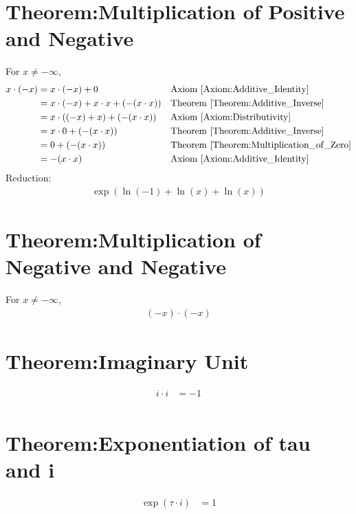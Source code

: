 \documentclass[12pt,a4paper]{report}
\begin{document}
\section{Theorem:Multiplication of Positive and Negative}
\label{Theorem:Multiplication_of_Positive_and_Negative}
For $x \neq -\infty$,
\begin{align*}
x \cdot (-x)
&= x \cdot (-x) + 0
&& \text{Axiom \ref{Axiom:Additive_Identity}} \\
&= x \cdot (-x) + x \cdot x + (- (x \cdot x))
&& \text{Theorem \ref{Theorem:Additive_Inverse}} \\
&= x \cdot ((-x)+x) + (- (x \cdot x))
&& \text{Axiom \ref{Axiom:Distributivity}} \\
&= x \cdot 0 + (- (x \cdot x))
&& \text{Theorem \ref{Theorem:Additive_Inverse}} \\
&= 0 + (- (x \cdot x))
&& \text{Theorem \ref{Theorem:Multiplication_of_Zero}} \\
&= - (x \cdot x)
&& \text{Axiom \ref{Axiom:Additive_Identity}} \\
\end{align*}
Reduction:
\begin{align*}
\exp(\ln(-1) + \ln(x) + \ln(x) )
\end{align*}

\section{Theorem:Multiplication of Negative and Negative}
\label{Theorem:Multiplication_of_Negative_and_Negative}
For $x \neq -\infty$,
\begin{align*}
(-x) \cdot (-x)
\end{align*}

\section{Theorem:Imaginary Unit}
\label{Theorem:Imaginary_Unit}
\begin{align*}
i \cdot i &= -1 \\
\end{align*}

\section{Theorem:Exponentiation of tau and i}
\label{Theorem:Exponentiation_of_tau_i}
\begin{align*}
\exp (\tau \cdot i) &= 1 \\
\end{align*}
\end{document}
